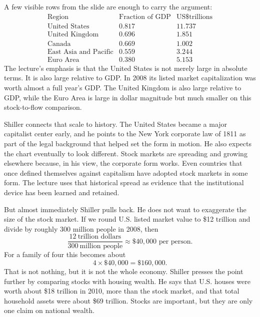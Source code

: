 A few visible rows from the slide are enough to carry the argument:
\[
\begin{array}{lcc}
\text{Region} & \text{Fraction of GDP} & \text{US\$ trillions} \\
\text{United States} & 0.817 & 11.737 \\
\text{United Kingdom} & 0.696 & 1.851 \\
\text{Canada} & 0.669 & 1.002 \\
\text{East Asia and Pacific} & 0.559 & 3.244 \\
\text{Euro Area} & 0.380 & 5.153
\end{array}
\]
The lecture's emphasis is that the United States is not merely large in absolute terms. It is also large relative to GDP. In 2008 its listed market capitalization was worth almost a full year's GDP. The United Kingdom is also large relative to GDP, while the Euro Area is large in dollar magnitude but much smaller on this stock-to-flow comparison.

Shiller connects that scale to history. The United States became a major capitalist center early, and he points to the New York corporate law of 1811 as part of the legal background that helped set the form in motion. He also expects the chart eventually to look different. Stock markets are spreading and growing elsewhere because, in his view, the corporate form works. Even countries that once defined themselves against capitalism have adopted stock markets in some form. The lecture uses that historical spread as evidence that the institutional device has been learned and retained.

But almost immediately Shiller pulls back. He does not want to exaggerate the size of the stock market. If we round U.S. listed market value to \$12 trillion and divide by roughly 300 million people in 2008, then
\begin{equation}
\frac{12\ \text{trillion dollars}}{300\ \text{million people}}
\approx \$40{,}000 \text{ per person}.
\end{equation}
For a family of four this becomes about
\begin{equation}
4 \times \$40{,}000 = \$160{,}000.
\end{equation}
That is not nothing, but it is not the whole economy. Shiller presses the point further by comparing stocks with housing wealth. He says that U.S. houses were worth about \$18 trillion in 2010, more than the stock market, and that total household assets were about \$69 trillion. Stocks are important, but they are only one claim on national wealth.

